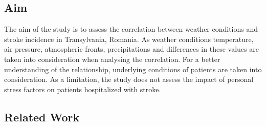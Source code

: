 \documentclass{article}
\begin{document}
\subsection{Aim}
The aim of the study is to assess the correlation between weather conditions and stroke incidence in Transylvania, Romania. As weather conditions temperature, air pressure, atmospheric fronts, precipitations and differences in these values are taken into consideration when analysing the correlation. For a better understanding of the relationship, underlying conditions of patients are taken into consideration. As a limitation, the study does not assess the impact of personal stress factors on patients hospitalized with stroke. 

\subsection{Related Work}
\end{document}
